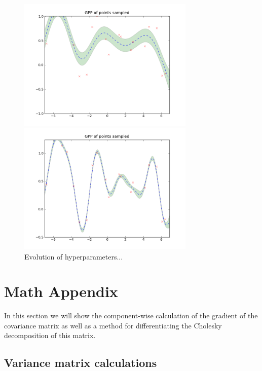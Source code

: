\documentclass[phd,tocprelim]{cornell}
\begin{document}
\begin{figure}[hpt]
 	\centerline{\includegraphics[width=0.75\textwidth]{figures/EPI/hyper_update_GPP_pre.png}}
    \centerline{\includegraphics[width=0.75\textwidth]{figures/EPI/hyper_update_GPP_post.png}}
    \caption[Evolution of hyperparameters]{Evolution of hyperparameters...}
 	\label{fig:EPI_hyper_2}
\end{figure}


\section{Math Appendix}

In this section we will show the component-wise calculation of the gradient of the covariance matrix as well as a method for differentiating the Cholesky decomposition of this matrix.

\subsection{Variance matrix calculations}
\label{EPI_imp_var}
\end{document}
